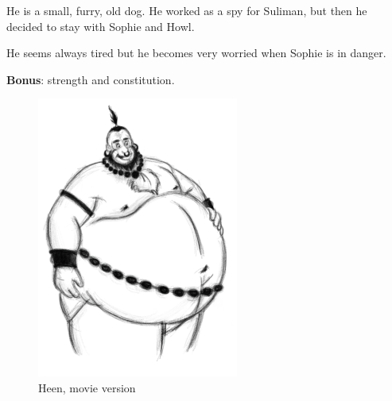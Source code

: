 \begin{minipage}{0.5\textwidth}
He is a small, furry, old dog. He worked as a spy for Suliman, but then he decided to stay with Sophie and Howl.

He seems always tired but he becomes very worried when Sophie is in danger.

\textbf{Bonus}: strength and constitution.\\

\end{minipage}%
%
\hfill\begin{minipage}{0.4\textwidth}
  \begin{figure}[H]
    \hfill\includegraphics{Images/Characters/belzel}
    \caption{Heen, movie version}
  \end{figure}
\end{minipage}
